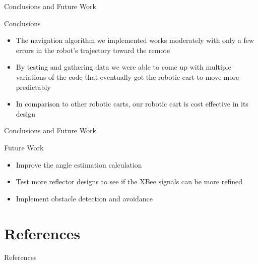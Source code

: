 \documentclass{beamer}
\begin{document}
\begin{frame}{Conclusions and Future Work}
  \begin{block}{Conclusions}
    \begin{itemize}
      \item The navigation algorithm we implemented works moderately with only a few errors in the robot's trajectory toward the remote
      \item By testing and gathering data we were able to come up with multiple variations of the code that eventually got the robotic cart to move more predictably
      \item In comparison to other robotic carts, our robotic cart is cost effective in its design
    \end{itemize}
  \end{block}
\end{frame}

\begin{frame}{Conclusions and Future Work}
  \begin{block}{Future Work}
    \begin{itemize}
      \item Improve the angle estimation calculation
      \item Test more reflector designs to see if the XBee signals can be more refined
      \item Implement obstacle detection and avoidance
    \end{itemize}
  \end{block}
\end{frame}


\section{References}

\begin{frame}{References}
  
  
\end{frame}

\end{document}
